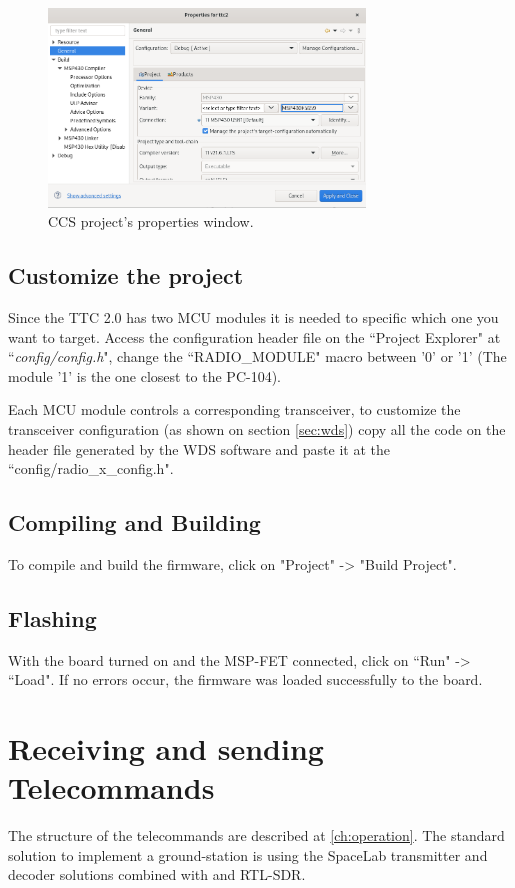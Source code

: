 \begin{figure}[!h]
	\begin{center}
		\includegraphics[width=0.75\textwidth]{figures/ccs_properties.png}
		\caption{CCS project's properties window.}
		\label{fig:project_properties}
	\end{center}
\end{figure}

\subsection{Customize the project}
Since the TTC 2.0 has two MCU modules it is needed to specific which one you want to target. Access the configuration header file on the ``Project Explorer" at ``\textit{config/config.h}", change the ``RADIO\_MODULE" macro between '0' or '1' (The module '1' is the one closest to the PC-104).

Each MCU module controls a corresponding transceiver, to customize the transceiver configuration (as shown on section \ref{sec:wds}) copy all the code on the header file generated by the WDS software and paste it at the ``config/radio\_x\_config.h".

\subsection{Compiling and Building}
To compile and build the firmware, click on "Project" -> "Build Project".

\subsection{Flashing}

With the board turned on and the MSP-FET connected, click on ``Run" -> ``Load". If no errors occur, the firmware was loaded successfully to the board.

\section{Receiving and sending Telecommands}

The structure of the telecommands are described at \autoref{ch:operation}. The standard solution to implement a ground-station is using the SpaceLab transmitter and decoder solutions \cite{sl-transmitter} \cite{sl-decoder} combined with and RTL-SDR.

